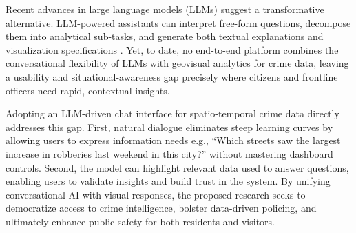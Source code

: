 Recent advances in large language models (LLMs) suggest a transformative alternative. LLM-powered assistants can interpret free-form questions, decompose them into analytical sub-tasks, and generate both textual explanations and visualization specifications \citep{Zhang2024NLITabular}. Yet, to date, no end-to-end platform combines the conversational flexibility of LLMs with geovisual analytics for crime data, leaving a usability and situational-awareness gap precisely where citizens and frontline officers need rapid, contextual insights.

Adopting an LLM-driven chat interface for spatio-temporal crime data directly addresses this gap. First, natural dialogue eliminates steep learning curves by allowing users to express information needs e.g., “Which streets saw the largest increase in robberies last weekend in this city?” without mastering dashboard controls.  Second, the model can highlight relevant data used to answer questions, enabling users to validate insights and build trust in the system. By unifying conversational AI with visual responses, the proposed research seeks to democratize access to crime intelligence, bolster data-driven policing, and ultimately enhance public safety for both residents and visitors.







